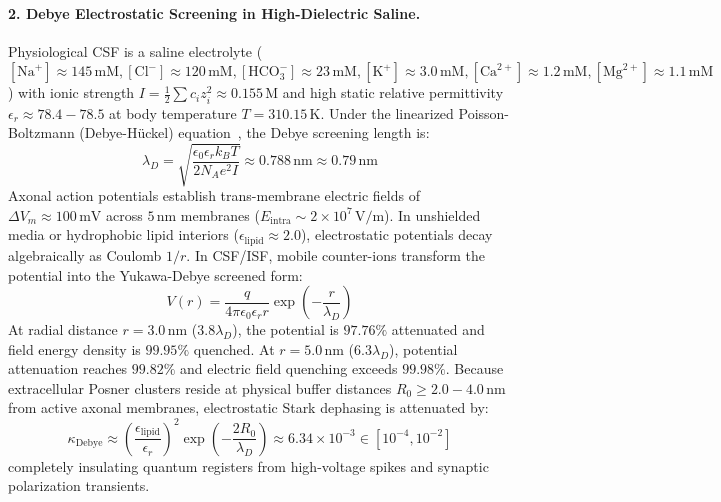 \documentclass[10pt,twocolumn,3p]{article}
\begin{document}
\paragraph{2. Debye Electrostatic Screening in High-Dielectric Saline.}
Physiological CSF is a saline electrolyte ($[\text{Na}^+] \approx 145\,\text{mM}, [\text{Cl}^-] \approx 120\,\text{mM}, [\text{HCO}_3^-] \approx 23\,\text{mM}, [\text{K}^+] \approx 3.0\,\text{mM}, [\text{Ca}^{2+}] \approx 1.2\,\text{mM}, [\text{Mg}^{2+}] \approx 1.1\,\text{mM}$) with ionic strength $I = \frac{1}{2}\sum c_i z_i^2 \approx 0.155\,\text{M}$ and high static relative permittivity $\epsilon_r \approx 78.4 - 78.5$ at body temperature $T = 310.15\,\text{K}$. Under the linearized Poisson-Boltzmann (Debye-H\"uckel) equation~\cite{debye1923}, the Debye screening length is:
\begin{equation}
    \lambda_D = \sqrt{\frac{\epsilon_0 \epsilon_r k_B T}{2 N_A e^2 I}} \approx 0.788\,\text{nm} \approx 0.79\,\text{nm}
    \label{eq:debye_screening_length}
\end{equation}
Axonal action potentials establish trans-membrane electric fields of $\Delta V_m \approx 100\,\text{mV}$ across $5\,\text{nm}$ membranes ($E_{\text{intra}} \sim 2 \times 10^7\,\text{V/m}$). In unshielded media or hydrophobic lipid interiors ($\epsilon_{\text{lipid}} \approx 2.0$), electrostatic potentials decay algebraically as Coulomb $1/r$. In CSF/ISF, mobile counter-ions transform the potential into the Yukawa-Debye screened form:
\begin{equation}
    V(r) = \frac{q}{4\pi\epsilon_0\epsilon_r r} \exp\left( -\frac{r}{\lambda_D} \right)
    \label{eq:yukawa_debye}
\end{equation}
At radial distance $r = 3.0\,\text{nm}$ ($3.8 \lambda_D$), the potential is $97.76\%$ attenuated and field energy density is $99.95\%$ quenched. At $r = 5.0\,\text{nm}$ ($6.3 \lambda_D$), potential attenuation reaches $99.82\%$ and electric field quenching exceeds $99.98\%$. Because extracellular Posner clusters reside at physical buffer distances $R_0 \ge 2.0 - 4.0\,\text{nm}$ from active axonal membranes, electrostatic Stark dephasing is attenuated by:
\begin{equation}
    \kappa_{\text{Debye}} \approx \left(\frac{\epsilon_{\text{lipid}}}{\epsilon_r}\right)^2 \exp\left(-\frac{2 R_0}{\lambda_D}\right) \approx 6.34 \times 10^{-3} \in [10^{-4}, 10^{-2}]
\end{equation}
completely insulating quantum registers from high-voltage spikes and synaptic polarization transients.
\end{document}
